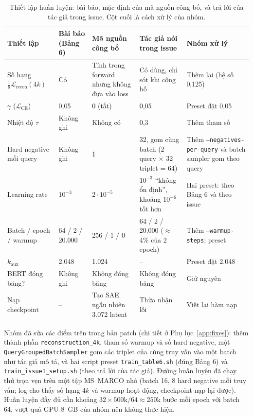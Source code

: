 \documentclass[a4paper,13pt]{extreport}
\theoremstyle{plain}
\begin{document}
\begin{table}[htbp]
\centering
\caption{Thiết lập huấn luyện: bài báo, mặc định của mã nguồn công bố, và trả lời của tác giả trong issue. Cột cuối là cách xử lý của nhóm.}
\label{tab:train-diff}
\footnotesize
\begin{tabular}{P{3.1cm}P{2.1cm}P{2.5cm}P{2.9cm}P{3.1cm}}
\toprule
\textbf{Thiết lập} & \textbf{Bài báo (Bảng 6)} & \textbf{Mã nguồn công bố} & \textbf{Tác giả nói trong issue} & \textbf{Nhóm xử lý}\\
\midrule
Số hạng $\tfrac18\mathcal{L}_{\mathrm{recon}}(4k)$ & Có & Tính trong forward nhưng không đưa vào loss & Có dùng, chỉ sót khi công bố & Thêm lại (hệ số 0,125)\\
$\gamma$ ($\mathcal{L}_{\mathrm{CE}}$) & 0,05 & 0 (tắt) & 0,05 & Preset đặt 0,05\\
Nhiệt độ $\tau$ & Không ghi & Không có & 0,3 & Thêm tham số\\
Hard negative mỗi query & Không ghi & 1 & 32, gom cùng batch (2 query $\times$ 32 triplet = 64) & Thêm \texttt{--negatives-per-query} và batch sampler gom theo query\\
Learning rate & $10^{-3}$ & $2\cdot10^{-5}$ & $10^{-3}$ ``không ổn định'', khoảng $10^{-6}$ tốt hơn & Hai preset: theo Bảng 6 và theo issue\\
Batch / epoch / warmup & 64 / 2 / 20.000 & 256 / 1 / 0 & 64 / 2 / 20.000 ($\approx$4\% của 2 epoch) & Thêm \texttt{--warmup-steps}; preset\\
$k_{\mathrm{aux}}$ & 2.048 & 1.024 & -- & Preset đặt 2.048\\
BERT đóng băng? & Không ghi & Không đóng băng & Không đóng băng & Giữ nguyên\\
Nạp checkpoint & -- & Tạo SAE ngẫu nhiên 3.072 latent & Thừa nhận lỗi & Viết lại hàm nạp\\
\bottomrule
\end{tabular}
\end{table}

Nhóm đã sửa các điểm trên trong bản patch (chi tiết ở Phụ lục~\ref{app:fixes}): thêm thành phần \texttt{reconstruction\_4k}, tham số warmup và số hard negative, một \texttt{QueryGroupedBatchSampler} gom các triplet của cùng truy vấn vào một batch như tác giả mô tả, và hai script preset \texttt{train\_table6.sh} (đúng Bảng 6) và \texttt{train\_issue1\_setup.sh} (theo trả lời của tác giả). Đường huấn luyện đã chạy thử trọn vẹn trên một tập MS~MARCO nhỏ (batch 16, 8 hard negative mỗi truy vấn; log cho thấy số hạng $4k$ và warmup hoạt động, checkpoint nạp lại được). Huấn luyện đầy đủ cần khoảng $32\times500\text{k}/64\approx250\text{k}$ bước mỗi epoch với batch 64, vượt quá GPU 8~GB của nhóm nên không thực hiện.
\end{document}
